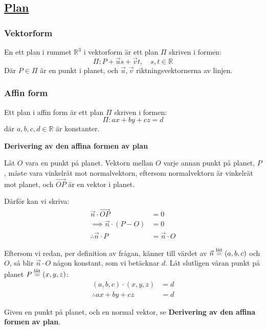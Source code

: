 \subsection{\href{https://sv.wikipedia.org/wiki/Plan_(geometri)}{Plan}}

\subsubsection{Vektorform}

En ett plan i rummet $\mathbb{R}^3$ i vektorform är ett plan $\Pi$ skriven i formen:
$$
	\Pi:P+\vec{u}s+\vec{v}t,\quad s,t\in\mathbb{R}
$$
Där $P\in\Pi$ är en punkt i planet, och $\vec{u},\vec{v}$ riktningsvektornerna av linjen.

\subsubsection{Affin form}\label{s:linalg:plan:affin-form}

Ett plan i affin form är ett plan $\Pi$ skriven i formen:
$$
	\Pi:ax+by+cz=d
$$
där $a,b,c,d\in\mathbb{R}$ är konstanter.

\begin{der}
\textbf{Derivering av den affina formen av plan}

Låt $O$ vara en punkt på planet.
Vektorn mellan $O$ varje annan punkt på planet, $P$, måste vara vinkelrät mot normalvektorn,
eftersom normalvektorn är vinkelrät mot planet, och $\overrightarrow{OP}$ är en vektor i planet.

Därför kan vi skriva:
\begin{align*}
	\vec{n}\cdot\overrightarrow{OP}&=0\\
	\implies \vec{n}\cdot(P-O)&=0\\
	\therefore \vec{n}\cdot P&=\vec{n}\cdot O
\end{align*}

Eftersom vi redan, per definition av frågan, känner till värdet av $\vec{n}\leteq(a,b,c)$
och $O$, så blir $\vec{n}\cdot O$ någon konstant, som vi betäcknar $d$.
Låt slutligen våran punkt på planet $P\leteq(x,y,z)$:
\begin{align*}
	(a,b,c)\cdot(x,y,z)&=d\\
	\therefore ax+by+cz&=d
\end{align*}
\end{der}

\begin{ber}
	Given en punkt på planet, och en normal vektor, se \textbf{Derivering av den affina formen av plan}.
\end{ber}

